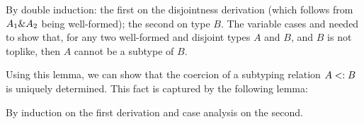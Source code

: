 {By double induction: the first on the disjointness derivation (which follows from $A_1 \& A_2$ being well-formed);
the second on type $B$.
The variable cases  and  needed to show that, for any two well-formed 
and disjoint types $A$ and $B$, and $B$ is not toplike, then $A$ cannot be a subtype of $B$.}

Using this lemma, we can show that the coercion of a subtyping relation $A <: B$ 
is uniquely determined.
This fact is captured by the following lemma:

{By induction on the first derivation and case analysis on the second.} 

